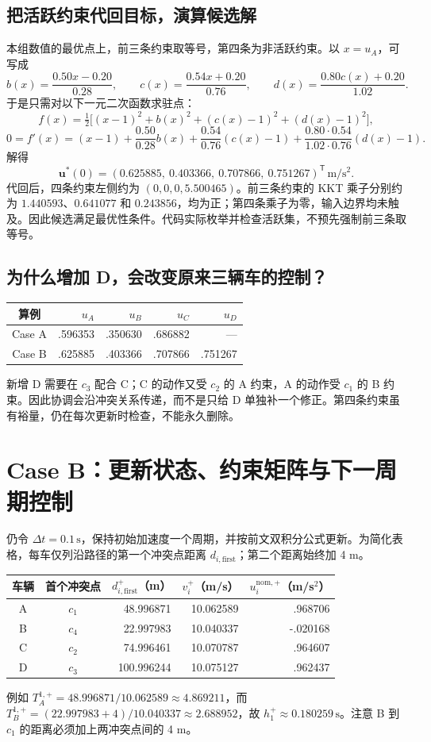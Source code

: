 \documentclass[UTF8,fontset=fandol,11pt,a4paper]{ctexart}
\newcommand{\nom}{\mathrm{nom}}
\newcommand{\unit}[1]{\,\mathrm{#1}}
\begin{document}
\subsection{把活跃约束代回目标，演算候选解}
本组数值的最优点上，前三条约束取等号，第四条为非活跃约束。以 $x=u_A$，可写成
\[
b(x)=\frac{0.50x-0.20}{0.28},\qquad
c(x)=\frac{0.54x+0.20}{0.76},\qquad
d(x)=\frac{0.80c(x)+0.20}{1.02}.
\]
于是只需对以下一元二次函数求驻点：
\[
f(x)=\tfrac12\big[(x-1)^2+b(x)^2+(c(x)-1)^2+(d(x)-1)^2\big],
\]
\[
0=f'(x)=(x-1)+\frac{0.50}{0.28}b(x)
+\frac{0.54}{0.76}(c(x)-1)
+\frac{0.80\cdot0.54}{1.02\cdot0.76}(d(x)-1).
\]
解得
\begin{equation}\boxed{
\mathbf u^*(0)=(0.625885,\ 0.403366,\ 0.707866,\ 0.751267)^{\mathsf T}\unit{m/s^2}.}
\end{equation}
代回后，四条约束左侧约为 $(0,0,0,5.500465)$。前三条约束的 KKT 乘子分别约为 $1.440593$、$0.641077$ 和 $0.243856$，均为正；第四条乘子为零，输入边界均未触及。因此候选满足最优性条件。代码实际枚举并检查活跃集，不预先强制前三条取等号。

\subsection{为什么增加 D，会改变原来三辆车的控制？}
\begin{center}\small
\begin{tabular}{crrrr}
\toprule
算例 & $u_A$ & $u_B$ & $u_C$ & $u_D$\\\midrule
Case A & .596353 & .350630 & .686882 & ---\\
Case B & .625885 & .403366 & .707866 & .751267\\\bottomrule
\end{tabular}\end{center}
新增 D 需要在 $c_3$ 配合 C；C 的动作又受 $c_2$ 的 A 约束，A 的动作受 $c_1$ 的 B 约束。因此协调会沿冲突关系传递，而不是只给 D 单独补一个修正。第四条约束虽有裕量，仍在每次更新时检查，不能永久删除。

\newpage
\section{Case B：更新状态、约束矩阵与下一周期控制}
仍令 $\Delta t=0.1\unit{s}$，保持初始加速度一个周期，并按前文双积分公式更新。为简化表格，每车仅列沿路径的第一个冲突点距离 $d_{i,\mathrm{first}}$；第二个距离始终加 4 m。
\begin{center}\small
\begin{tabular}{ccrrr}
\toprule
车辆 & 首个冲突点 & $d_{i,\mathrm{first}}^+$（m） & $v_i^+$（m/s） & $u_i^{\nom,+}$（m/s$^2$）\\\midrule
A & $c_1$ &48.996871&10.062589& .968706\\
B & $c_4$ &22.997983&10.040337&-.020168\\
C & $c_2$ &74.996461&10.070787& .964607\\
D & $c_3$ &100.996244&10.075127& .962437\\\bottomrule
\end{tabular}\end{center}
例如 $T_A^{1,+}=48.996871/10.062589\approx4.869211$，而
$T_B^{1,+}=(22.997983+4)/10.040337\approx2.688952$，故 $h_1^+\approx0.180259\unit{s}$。注意 B 到 $c_1$ 的距离必须加上两冲突点间的 4 m。
\end{document}

